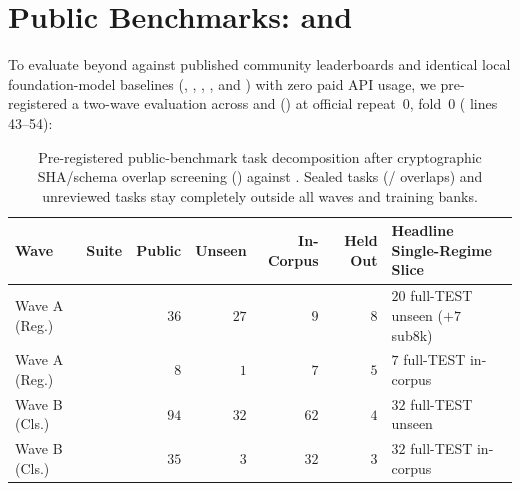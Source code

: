 \section{Public Benchmarks:  and }
\label{sec:results-public}

To evaluate \EZ{} beyond  against published community leaderboards and identical local foundation-model baselines (, ,  \citep{zhang2026limix2}, , and ) with zero paid API usage, we pre-registered a two-wave evaluation across  \citep{erickson2025tabarena} and  () at official repeat~0, fold~0 ( lines 43--54):

\begin{table}[t]
\centering
\sffamily\footnotesize\lining
\setlength\tabcolsep{4.5pt}
\begin{tabularx}{\linewidth}{@{}llrrrrL@{}}
\toprule
Wave & Suite & Public & Unseen & In-Corpus & Held Out & Headline Single-Regime Slice \\
\midrule
Wave A (Reg.) &  & $36$ & $27$ & $9$ & $8$ & $20$ full-TEST unseen ($+7$ sub8k) \\
Wave A (Reg.) &  & $8$ & $1$ & $7$ & $5$ & $7$ full-TEST in-corpus \\
Wave B (Cls.) &  & $94$ & $32$ & $62$ & $4$ & $32$ full-TEST unseen \\
Wave B (Cls.) &  & $35$ & $3$ & $32$ & $3$ & $32$ full-TEST in-corpus \\
\bottomrule
\end{tabularx}
\caption{Pre-registered public-benchmark task decomposition after cryptographic SHA/schema overlap screening () against . Sealed tasks (/ overlaps) and unreviewed tasks stay completely outside all waves and training banks.}
\label{tab:public-suites}
\end{table}

